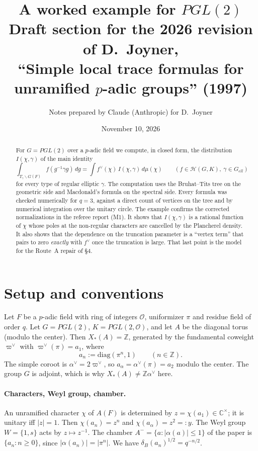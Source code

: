 \documentclass[11pt]{article}
\title{A worked example for $PGL(2)$\\[1ex]
\large Draft section for the 2026 revision of D.~Joyner,\\ ``Simple local trace formulas for unramified $p$-adic groups'' (1997)}
\author{Notes prepared by Claude (Anthropic) for D.~Joyner}
\date{November 10, 2026}
\theoremstyle{remark}
\newcommand{\OO}{\mathcal{O}}
\newcommand{\Hc}{\mathcal{H}}
\begin{document}
\maketitle

\begin{abstract}
For $G=PGL(2)$ over a $p$-adic field we compute, in closed form, the distribution $I(\chi,\gamma)$ of the main identity
\[
\int_{T_\gamma\backslash G(F)} f(g^{-1}\gamma g)\,dg=\int f^\vee(\chi)\,I(\chi,\gamma)\,d\mu(\chi)\qquad(f\in\Hc(G,K),\ \gamma\in G_{ell})
\]
for every type of regular elliptic $\gamma$. The computation uses the Bruhat--Tits tree on the geometric side and Macdonald's formula on the spectral side. Every formula was checked numerically for $q=3$, against a direct count of vertices on the tree and by numerical integration over the unitary circle. The example confirms the corrected normalizations in the referee report (M1). It shows that $I(\chi,\gamma)$ is a rational function of $\chi$ whose poles at the non-regular characters are cancelled by the Plancherel density. It also shows that the dependence on the truncation parameter is a ``vertex term'' that pairs to zero \emph{exactly} with $f^\vee$ once the truncation is large. That last point is the model for the Route~A repair of \S4.
\end{abstract}

\section{Setup and conventions}

Let $F$ be a $p$-adic field with ring of integers $\OO$, uniformizer $\pi$ and residue field of order $q$. Let $G=PGL(2)$, $K=PGL(2,\OO)$, and let $A$ be the diagonal torus (modulo the center). Then $X_*(A)=\mathbb{Z}$, generated by the fundamental coweight $\varpi^\vee$ with $\varpi^\vee(\pi)=a_1$, where
\[
a_n:=\mathrm{diag}(\pi^n,1)\qquad(n\in\mathbb{Z}).
\]
The simple coroot is $\alpha^\vee=2\varpi^\vee$, so $a_\alpha=\alpha^\vee(\pi)=a_2$ modulo the center. The group $G$ is adjoint, which is why $X_*(A)\neq\mathbb{Z}\alpha^\vee$ here.

\paragraph{Characters, Weyl group, chamber.}
An unramified character $\chi$ of $A(F)$ is determined by $z=\chi(a_1)\in\mathbb{C}^\times$; it is unitary iff $|z|=1$. Then $\chi(a_n)=z^n$ and $\chi(a_\alpha)=z^2=:y$. The Weyl group $W=\{1,s\}$ acts by $z\mapsto z^{-1}$. The chamber $A^-=\{a:|\alpha(a)|\le1\}$ of the paper is $\{a_n:n\ge0\}$, since $|\alpha(a_n)|=|\pi^n|$. We have $\delta_B(a_n)^{1/2}=q^{-n/2}$.
\end{document}
